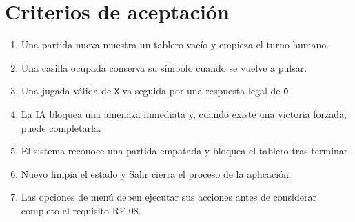 \section{Criterios de aceptación}
\begin{enumerate}
  \item Una partida nueva muestra un tablero vacío y empieza el turno humano.
  \item Una casilla ocupada conserva su símbolo cuando se vuelve a pulsar.
  \item Una jugada válida de \texttt{X} va seguida por una respuesta legal de \texttt{O}.
  \item La IA bloquea una amenaza inmediata y, cuando existe una victoria forzada, puede completarla.
  \item El sistema reconoce una partida empatada y bloquea el tablero tras terminar.
  \item Nuevo limpia el estado y Salir cierra el proceso de la aplicación.
  \item Las opciones de menú deben ejecutar sus acciones antes de considerar completo el requisito RF-08.
\end{enumerate}

